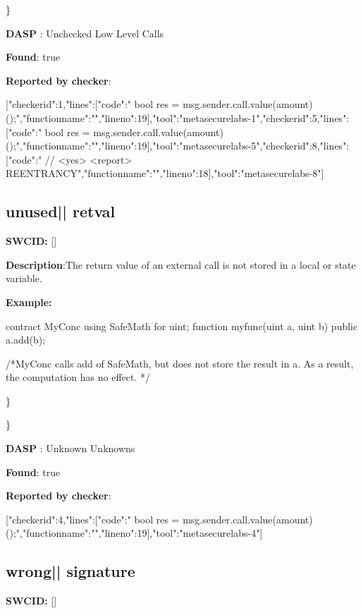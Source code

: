 \documentclass{article}
\begin{document}
\} 

\textbf{DASP} : Unchecked Low Level Calls

\textbf{Found}: true

\textbf{Reported by checker}: 
\begin{ffcode} 

[{"checker\textunderscore id":1,"lines":[{"code":"      bool res = msg.sender.call.value(amount)();\n","function\textunderscore name":"","line\textunderscore no":19}],"tool":"metasecurelabs-1"},{"checker\textunderscore id":5,"lines":[{"code":"      bool res = msg.sender.call.value(amount)();\n","function\textunderscore name":"","line\textunderscore no":19}],"tool":"metasecurelabs-5"},{"checker\textunderscore id":8,"lines":[{"code":"      // <yes> <report> REENTRANCY\n","function\textunderscore name":"","line\textunderscore no":18}],"tool":"metasecurelabs-8"}]
\end{ffcode} 
\subsection{unused{|\textunderscore| }retval} 
\textbf{SWC{\textunderscore }ID:} []

\textbf{Description}:The return value of an external call is not stored in a local or state variable.


\textbf{Example:} 
\begin{ffcode} 

contract MyConc{
    using SafeMath for uint;
    function my\textunderscore func(uint a, uint b) public{
        a.add(b);
    }
}

 /*MyConc calls add of SafeMath, but does not store the result in a. As a result, the computation has no effect. */ 

\end{ffcode} 
\} 

\} 

\textbf{DASP} : Unknown Unknowns

\textbf{Found}: true

\textbf{Reported by checker}: 
\begin{ffcode} 

[{"checker\textunderscore id":4,"lines":[{"code":"      bool res = msg.sender.call.value(amount)();\n","function\textunderscore name":"","line\textunderscore no":19}],"tool":"metasecurelabs-4"}]
\end{ffcode} 
\subsection{wrong{|\textunderscore| }signature} 
\textbf{SWC{\textunderscore }ID:} []
\end{document}
